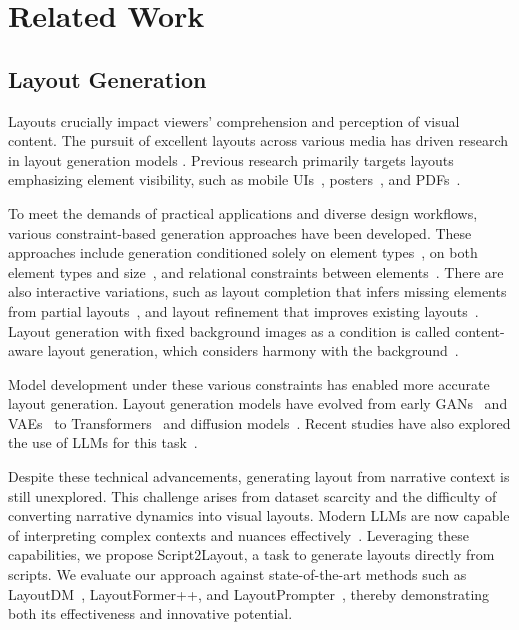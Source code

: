 \section{Related Work}
\subsection{Layout Generation}
Layouts crucially impact viewers' comprehension and perception of visual content. The pursuit of excellent layouts across various media has driven research in layout generation models \cite{shi_intelligent_2023,shi_understanding_2023,huang_survey_2023}. Previous research primarily targets layouts emphasizing element visibility, such as mobile UIs~\cite{deka_rico_2017,jiang_coarse--fine_2022}, posters~\cite{seol_posterllama_2024, tanaka_scipostlayout_2024, advertising_posters}, and PDFs~\cite{zhong_publaynet_2019,jiang_coarse--fine_2022}. 

To meet the demands of practical applications and diverse design workflows, various constraint-based generation approaches have been developed. These approaches include generation conditioned solely on element types~\cite{lee2020neural,jiang_layoutformer_2023}, on both element types and size~\cite{jiang_layoutformer_2023,kong2022blt}, and relational constraints between elements~\cite{lee2020neural,kikuchi_constrained_2021}. There are also interactive variations, such as layout completion that infers missing elements from partial layouts~\cite{gupta2021layouttransformer}, and layout refinement that improves existing layouts~\cite{rahman2021ruite}. Layout generation with fixed background images as a condition is called content-aware layout generation, which considers harmony with the background~\cite{RetrievalAugmentedLayoutTransformer2024,seol_posterllama_2024}.

Model development under these various constraints has enabled more accurate layout generation.
Layout generation models have evolved from early GANs~\cite{li_layoutgan_2019} and VAEs~\cite{arroyo_variational_2021, jyothi2021layoutvaestochasticscenelayout} to Transformers~\cite{jiang_layoutformer_2023} and diffusion models~\cite{inoue2023layoutdm, zhang_layoutdiffusion_2023,Chen_2024_WACV}. Recent studies have also explored the use of LLMs for this task~\cite{lin_layoutprompter_2023,tanaka_scipostlayout_2024}.

Despite these technical advancements, generating layout from narrative context is still unexplored. This challenge arises from dataset scarcity and the difficulty of converting narrative dynamics into visual layouts. Modern LLMs are now capable of interpreting complex contexts and nuances effectively~\cite{LLMunderstandingNarrative}. 
Leveraging these capabilities, we propose Script2Layout, a task to generate layouts directly from scripts. We evaluate our approach against state-of-the-art methods such as LayoutDM~\cite{inoue2023layoutdm}, LayoutFormer++\cite{jiang_layoutformer_2023}, and LayoutPrompter~\cite{lin_layoutprompter_2023}, thereby demonstrating both its effectiveness and innovative potential.

